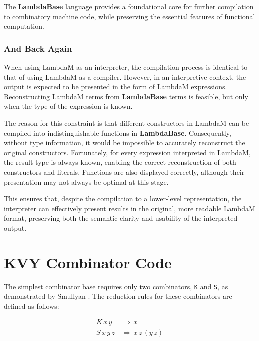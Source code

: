 \documentclass{IEEEtran}
\begin{document}
\par The \textbf{LambdaBase} language provides a foundational core for further compilation to combinatory machine code, while preserving the essential features of functional computation.

\subsubsection{And Back Again}

\par When using LambdaM as an interpreter, the compilation process is identical to that of using LambdaM as a compiler. However, in an interpretive context, the output is expected to be presented in the form of LambdaM expressions. Reconstructing LambdaM terms from \textbf{LambdaBase} terms is feasible, but only when the type of the expression is known.

\par The reason for this constraint is that different constructors in LambdaM can be compiled into indistinguishable functions in \textbf{LambdaBase}. Consequently, without type information, it would be impossible to accurately reconstruct the original constructors. Fortunately, for every expression interpreted in LambdaM, the result type is always known, enabling the correct reconstruction of both constructors and literals. Functions are also displayed correctly, although their presentation may not always be optimal at this stage.

\par This ensures that, despite the compilation to a lower-level representation, the interpreter can effectively present results in the original, more readable LambdaM format, preserving both the semantic clarity and usability of the interpreted output.

\section{KVY Combinator Code}

\par The simplest combinator base requires only two combinators, \verb!K! and \verb!S!, as demonstrated by Smullyan \cite{Smullyan}. The reduction rules for these combinators are defined as follows:

\begin{align*}
K \, x \, y \, &\Rightarrow \, x \\
S \, x \, y \, z \, &\Rightarrow \, x \, z \, (y \, z)
\end{align*}
\end{document}
